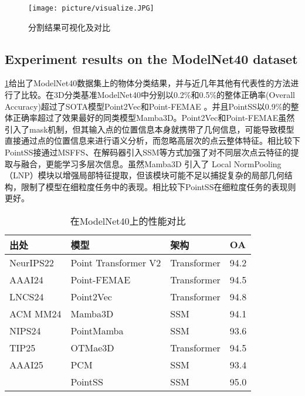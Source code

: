 \documentclass[preprint,12pt]{elsarticle}
\begin{document}
\begin{figure}[htbp]
	\centering
	\texttt{[image: picture/visualize.JPG]}
	\caption{分割结果可视化及对比}
	\label{fig:vis}
\end{figure}




\subsection{Experiment results on the ModelNet40 dataset}
\cref{tab:ModelNet}给出了ModelNet40数据集上的物体分类结果，并与近几年其他有代表性的方法进行了比较。在3D分类基准ModelNet40中分别以0.2\%和0.5\%的整体正确率(Overall Accuracy)超过了SOTA模型Point2Vec\cite{Point2Vec}和Point-FEMAE\cite{FEMAE} 。并且PointSS以0.9\%的整体正确率超过了效果最好的同类模型Mamba3D。Point2Vec和Point-FEMAE虽然引入了mask机制，但其输入点的位置信息本身就携带了几何信息，可能导致模型直接通过点的位置信息来进行语义分析，而忽略高层次的点云整体特征。相比较下PointSS接通过MSFFS、在解码器引入SSM等方式加强了对不同层次点云特征的提取与融合，更能学习多层次信息。虽然Mamba3D 引入了 Local NormPooling（LNP）模块以增强局部特征提取，但该模块可能不足以捕捉复杂的局部几何结构，限制了模型在细粒度任务中的表现。相比较下PointSS在细粒度任务的表现则更好。


\begin{table}[htbp!]
	\centering
	\caption{在ModelNet40上的性能对比}
	\label{tab:ModelNet}
	\begin{tabular}{@{}llll@{}}
		\toprule
		\textbf{出处}  & \textbf{模型}           & \textbf{架构} & \textbf{OA} \\ \midrule
		NeurIPS22 & Point Transformer V2\cite{ptv2}  & Transformer & 94.2          \\
		AAAI24    & Point-FEMAE\cite{FEMAE}        & Transformer & 94.5             \\
		LNCS24      & Point2Vec\cite{Point2Vec}      & Transformer & 94.8          \\
		ACM MM24     & Mamba3D\cite{Mamba3D}              & SSM & 94.1          \\
		NIPS24    & PointMamba\cite{PointMamba}   & SSM         & 93.6         \\
		TIP25     & OTMae3D\cite{OTMae3D}    & Transformer & 94.5          \\
		AAAI25    & PCM\cite{pcm}     & SSM         & 93.4         \\
		& PointSS               &SSM             & 95.0          \\ \bottomrule
	\end{tabular}
\end{table}
\end{document}

